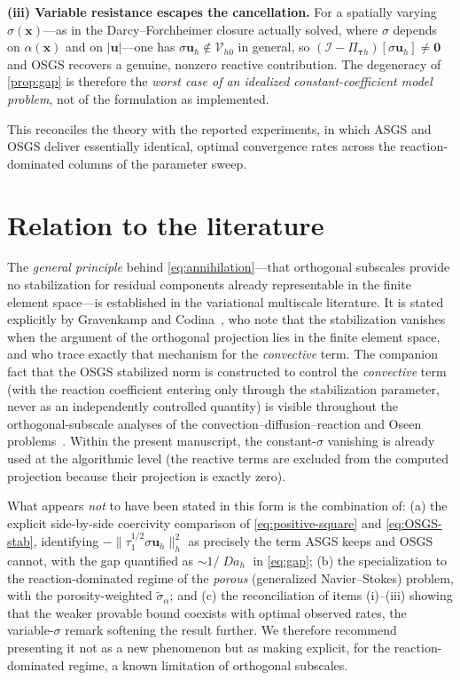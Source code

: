 \documentclass[11pt]{article}
\newcommand{\Damk}{\operatorname{\mathit{Da}}}
\theoremstyle{plain}
\theoremstyle{remark}
\newcommand{\uh}{\boldsymbol{u}_h}
\newcommand{\Pio}{\Pi_{\boldsymbol{\tau}h}}            %
\newcommand{\siga}{\widetilde{\sigma}_\alpha}
\begin{document}
\smallskip
\noindent\textbf{(iii) Variable resistance escapes the cancellation.} For a
spatially varying $\sigma(\boldsymbol{x})$---as in the Darcy--Forchheimer closure
actually solved, where $\sigma$ depends on $\alpha(\boldsymbol{x})$ and on
$|\boldsymbol{u}|$---one has $\sigma\uh\notin\mathcal{V}_{h0}$ in general, so
$(\mathcal{I}-\Pio)[\sigma\uh]\neq\boldsymbol{0}$ and OSGS recovers a genuine,
nonzero reactive contribution. The degeneracy of \cref{prop:gap} is therefore the
\emph{worst case of an idealized constant-coefficient model problem}, not of the
formulation as implemented.

\smallskip
This reconciles the theory with the reported experiments, in which ASGS and OSGS
deliver essentially identical, optimal convergence rates across the
reaction-dominated columns of the parameter sweep.

\section{Relation to the literature}
The \emph{general principle} behind \cref{eq:annihilation}---that orthogonal
subscales provide no stabilization for residual components already representable in
the finite element space---is established in the variational multiscale
literature. It is stated explicitly by Gravenkamp and
Codina~\cite{gravenkamp2023dispersed}, who note that the stabilization vanishes
when the argument of the orthogonal projection lies in the finite element space,
and who trace exactly that mechanism for the \emph{convective} term. The
companion fact that the OSGS stabilized norm is constructed to control the
\emph{convective} term (with the reaction coefficient entering only through the
stabilization parameter, never as an independently controlled quantity) is visible
throughout the orthogonal-subscale analyses of the convection--diffusion--reaction
and Oseen problems~\cite{codina2002stabilized,codina-blasco2002cdr,codina2008analysis}.
Within the present manuscript, the constant-$\sigma$ vanishing is already used at
the algorithmic level (the reactive terms are excluded from the computed
projection because their projection is exactly zero).

What appears \emph{not} to have been stated in this form is the combination of:
(a) the explicit side-by-side coercivity comparison of \cref{eq:positive-square}
and \cref{eq:OSGS-stab}, identifying $-\|\tau_1^{1/2}\sigma\uh\|_h^2$ as precisely
the term ASGS keeps and OSGS cannot, with the gap quantified as $\sim1/\Damk_h$ in
\cref{eq:gap}; (b) the specialization to the reaction-dominated regime of the
\emph{porous} (generalized Navier--Stokes) problem, with the porosity-weighted
$\siga$; and (c) the reconciliation of items (i)--(iii) showing that the weaker
provable bound coexists with optimal observed rates, the variable-$\sigma$ remark
softening the result further. We therefore recommend presenting it not as a new
phenomenon but as making explicit, for the reaction-dominated regime, a known
limitation of orthogonal subscales.
\end{document}
